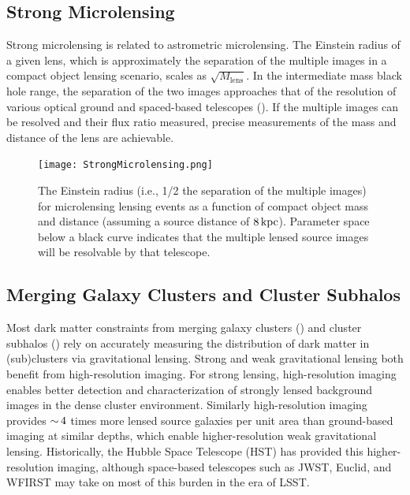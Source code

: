 \subsection{Strong Microlensing }
Strong microlensing is related to astrometric microlensing.
The Einstein radius of a given lens, which is approximately the separation of the multiple images in a compact object lensing scenario, scales as $\sqrt{M_\mathrm{lens}}$.
In the intermediate mass black hole range, the separation of the two images approaches that of the resolution of various optical ground and spaced-based telescopes ().
If the multiple images can be resolved and their flux ratio measured, precise measurements of the mass and distance of the lens are achievable.

\begin{figure}
\label{fig:strong_microlensing}
\centering
\texttt{[image: StrongMicrolensing.png]}
\caption{The Einstein radius (i.e., 1/2 the separation of the multiple images) for microlensing lensing events as a function of compact object mass and distance (assuming a source distance of $8\mathrm{\,kpc}$). Parameter space below a black curve indicates that the multiple lensed source images will be resolvable by that telescope.}
\end{figure}

\subsection{Merging Galaxy Clusters and Cluster Subhalos}

Most dark matter constraints from merging galaxy clusters () and cluster subhalos () rely on accurately measuring the distribution of dark matter in (sub)clusters via gravitational lensing.
Strong and weak gravitational lensing both benefit from high-resolution imaging.
For strong lensing, high-resolution imaging enables better detection and characterization of strongly lensed background images in the dense cluster environment.
Similarly high-resolution imaging provides $ {\sim}\,4$ times more lensed source galaxies per unit area than ground-based imaging at similar depths, which enable higher-resolution weak gravitational lensing.
Historically, the Hubble Space Telescope (HST) has provided this higher-resolution imaging, although space-based telescopes such as JWST, Euclid, and WFIRST may take on most of this burden in the era of LSST.

